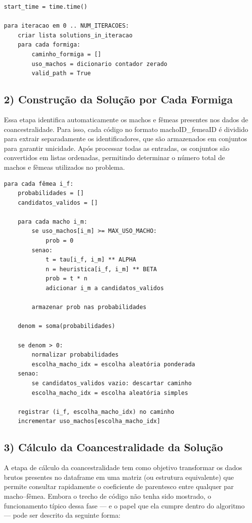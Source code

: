\begin{verbatim} 
start_time = time.time()

para iteracao em 0 .. NUM_ITERACOES:
    criar lista solutions_in_iteracao
    para cada formiga:
        caminho_formiga = []
        uso_machos = dicionario contador zerado
        valid_path = True
\end{verbatim}
\vspace{1em}

\subsection*{2) Construção da Solução por Cada Formiga}
Essa etapa identifica automaticamente os machos e fêmeas presentes nos dados de coancestralidade. Para isso, cada código no formato machoID\_femeaID é dividido para extrair separadamente os identificadores, que são armazenados em conjuntos para garantir unicidade. Após processar todas as entradas, os conjuntos são convertidos em listas ordenadas, permitindo determinar o número total de machos e fêmeas utilizados no problema.

\begin{verbatim}
para cada fêmea i_f:
    probabilidades = []
    candidatos_validos = []

    para cada macho i_m:
        se uso_machos[i_m] >= MAX_USO_MACHO:
            prob = 0
        senao:
            t = tau[i_f, i_m] ** ALPHA
            n = heuristica[i_f, i_m] ** BETA
            prob = t * n
            adicionar i_m a candidatos_validos

        armazenar prob nas probabilidades

    denom = soma(probabilidades)

    se denom > 0:
        normalizar probabilidades
        escolha_macho_idx = escolha aleatória ponderada
    senao:
        se candidatos_validos vazio: descartar caminho
        escolha_macho_idx = escolha aleatória simples

    registrar (i_f, escolha_macho_idx) no caminho
    incrementar uso_machos[escolha_macho_idx]
\end{verbatim}
\vspace{1em}

\subsection*{3) Cálculo da Coancestralidade da Solução}
A etapa de cálculo da coancestralidade tem como objetivo transformar os dados brutos presentes no dataframe em uma matriz (ou estrutura equivalente) que permite consultar rapidamente o coeficiente de parentesco entre qualquer par macho–fêmea. Embora o trecho de código não tenha sido mostrado, o funcionamento típico dessa fase — e o papel que ela cumpre dentro do algoritmo — pode ser descrito da seguinte forma:

